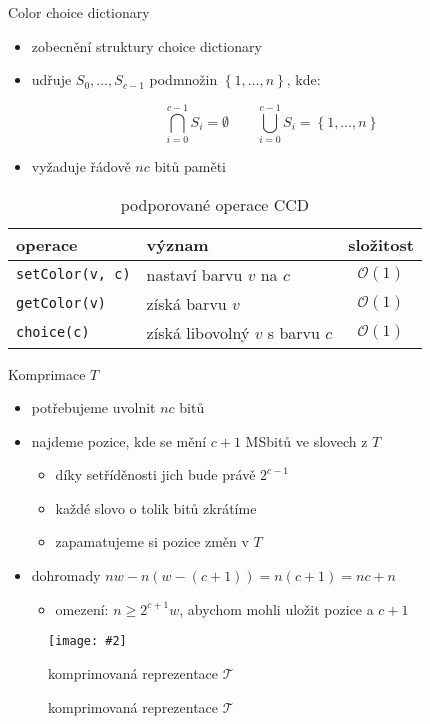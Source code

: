 \documentclass{beamer}
\makeatletter
\newcommand{\fitimage}[2][\@nil]{
	\begin{figure}
		\begin{adjustbox}{width=0.9\textwidth, totalheight=\textheight-2\baselineskip-2\baselineskip,keepaspectratio}
			\texttt{[image: \#2]}
		\end{adjustbox}
		\def\tmp{#1}%
	 \ifx\tmp\@nnil
			\else
			\caption{#1}
		\fi
	\end{figure}
}
\makeatother
\begin{document}
	\begin{frame}{Color choice dictionary}
		\begin{itemize}
			\item zobecnění struktury choice dictionary
			\item udřuje $S_0, \ldots, S_{c - 1}$ podmnožin $\left\{1, \ldots, n\right\}$, kde:

				$$\bigcap_{i=0}^{c-1} S_i = \emptyset \qquad\bigcup_{i=0}^{c-1} S_i = \left\{1, \ldots, n\right\}$$

			\item vyžaduje řádově $nc$ bitů paměti
		\end{itemize}

		\vfill

		\begin{table}
			\centering
			\begin{tabular}{llc}
				\toprule
				operace & význam & složitost \\
				\midrule
				\texttt{setColor(v, c)} & nastaví barvu $v$ na $c$        & $\mathcal{O}\left(1\right)$ \\
				\texttt{getColor(v)}    & získá barvu $v$                 & $\mathcal{O}\left(1\right)$ \\
				\texttt{choice(c)}      & získá libovolný $v$ s barvu $c$ & $\mathcal{O}\left(1\right)$ \\
				\bottomrule
			\end{tabular}
			\caption{podporované operace CCD}
		\end{table}
	\end{frame}

	\begin{frame}{Komprimace $T$}
		\begin{itemize}
			\item potřebujeme uvolnit $nc$ bitů
				\vfill
			\item najdeme pozice, kde se mění $c + 1$ MSbitů ve slovech z $T$
			\begin{itemize}
				\item díky setříděnosti jich bude právě $2^{c - 1}$
				\item každé slovo o tolik bitů zkrátíme
				\item zapamatujeme si pozice změn v $T$
			\end{itemize}
				\vfill
			\item dohromady $nw - n(w - (c + 1)) = n(c + 1) = nc + n$
			\begin{itemize}
				\item omezení: $n \ge 2^{c + 1}w$, abychom mohli uložit pozice a $c + 1$
			\end{itemize}
		\end{itemize}

		\fitimage[komprimovaná reprezentace $\mathcal{T}$]{images/compression.png}
	\end{frame}
\end{document}
